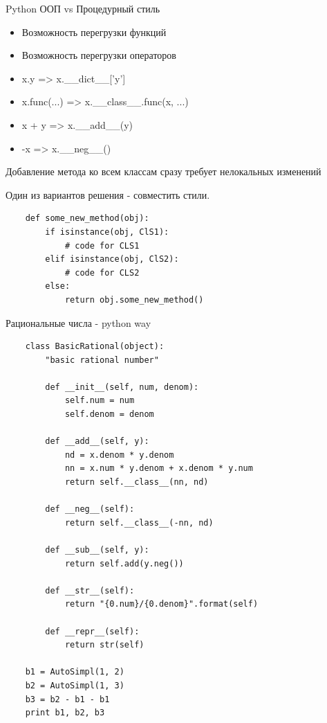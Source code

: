 \documentclass{article}
\begin{document}
\begin{center} Python ООП vs Процедурный стиль \end{center}
\begin{itemize}
    \item Возможность перегрузки функций
    \item Возможность перегрузки операторов
    \item x.y => x.\_\_dict\_\_['y']
    \item x.func(...) => x.\_\_class\_\_.func(x, ...)
    \item x + y => x.\_\_add\_\_(y)
    \item -x => x.\_\_neg\_\_()
\end{itemize}
\newpage

\begin{center} Добавление метода ко всем классам сразу требует нелокальных изменений \end{center}
Один из вариантов решения - совместить стили.
\begin{lstlisting}
    def some_new_method(obj):
        if isinstance(obj, ClS1):
            # code for CLS1
        elif isinstance(obj, ClS2):
            # code for CLS2
        else:
            return obj.some_new_method()
\end{lstlisting}
\newpage

\begin{center} Рациональные числа - python way \end{center}
\begin{lstlisting}
    class BasicRational(object):
        "basic rational number"

        def __init__(self, num, denom):
            self.num = num
            self.denom = denom

        def __add__(self, y):
            nd = x.denom * y.denom
            nn = x.num * y.denom + x.denom * y.num
            return self.__class__(nn, nd)

        def __neg__(self):
            return self.__class__(-nn, nd)

        def __sub__(self, y):
            return self.add(y.neg())

        def __str__(self):
            return "{0.num}/{0.denom}".format(self)

        def __repr__(self):
            return str(self)

    b1 = AutoSimpl(1, 2)
    b2 = AutoSimpl(1, 3)
    b3 = b2 - b1 - b1
    print b1, b2, b3
\end{lstlisting}
\newpage

\end{document}
